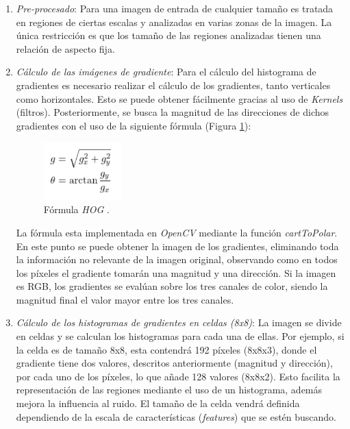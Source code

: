 \begin{enumerate}
	\item \textit{Pre-procesado}: Para una imagen de entrada de cualquier tamaño es tratada en regiones de ciertas escalas y analizadas en varias zonas de la imagen. La única restricción es que los tamaño de las regiones analizadas tienen una relación de aspecto fija.
	
	\item \textit{Cálculo de las imágenes de gradiente}: Para el cálculo del histograma de gradientes es necesario realizar el cálculo de los gradientes, tanto verticales como horizontales. Esto se puede obtener fácilmente gracias al uso de \textit{Kernels} (filtros). Posteriormente, se busca la magnitud de las direcciones de dichos gradientes con el uso de la siguiente fórmula (Figura \ref{fig:hogf}):
	
	\begin{figure}[htp]
		\centering
		\includegraphics[width=3cm]{imagenes/HOGFormula.png}
		\caption{Fórmula \textit{HOG} \cite{hog2}.}
		\label{fig:hogf}
	\end{figure}
	
	La fórmula esta implementada en \textit{OpenCV} mediante la función \textit{cartToPolar}. En este punto se puede obtener la imagen de los gradientes, eliminando toda la información no relevante de la imagen original, observando como en todos los píxeles el gradiente tomarán una magnitud y una dirección. Si la imagen es RGB, los gradientes se evalúan sobre los tres canales de color, siendo la magnitud final el valor mayor entre los tres canales.
	
	\item \textit{Cálculo de los histogramas de gradientes en celdas (8x8)}: La imagen se divide en celdas y se calculan los histogramas para cada una de ellas. Por ejemplo, si la celda es de tamaño 8x8, esta contendrá 192 píxeles (8x8x3), donde el gradiente tiene dos valores, descritos anteriormente (magnitud y dirección), por cada uno de los píxeles, lo que añade 128 valores (8x8x2). Esto facilita la representación de las regiones mediante el uso de un histograma, además mejora la influencia al ruido. El tamaño de la celda vendrá definida dependiendo de la escala de características (\textit{features}) que se estén buscando.
	

\end{enumerate}
